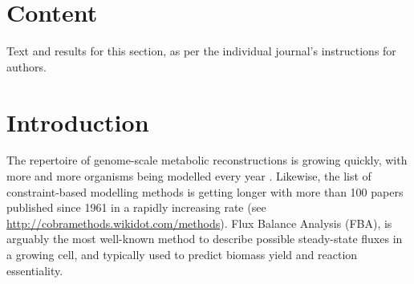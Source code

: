 \documentclass[twocolumn]{bmcart}%
\begin{document}


\section*{Content}
Text and results for this section, as per the individual journal's instructions for authors. %

\section*{Introduction}
The repertoire of genome-scale metabolic reconstructions is growing quickly, with more and more organisms being modelled every year \cite{King2016-it}. Likewise, the list of constraint-based modelling methods is getting longer with more than 100 papers published since 1961 in a rapidly increasing rate \cite{Lewis2012-mu} (see \url{http://cobramethods.wikidot.com/methods}). Flux Balance Analysis (FBA), is arguably the most well-known method to describe possible steady-state fluxes in a growing cell, and typically used to predict biomass yield and reaction essentiality. 
\end{document}
